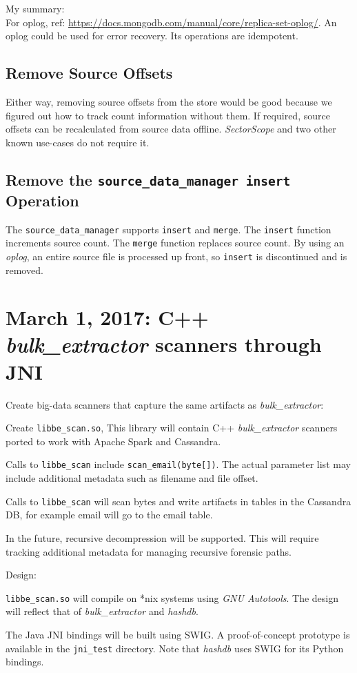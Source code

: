 \documentclass[12pt,twoside]{article}
\newcommand \hdb {\textit{hashdb}\xspace}
\newcommand \sscope {\textit{SectorScope}\xspace}
\newcommand \bulk {\textit{bulk\_extractor}\xspace}
\begin{document}
My summary:\\
For oplog, ref: \url{https://docs.mongodb.com/manual/core/replica-set-oplog/}. An oplog could be used for error recovery.  Its operations are idempotent.

\subsection{Remove Source Offsets}
Either way, removing source offsets from the store would be good because we figured out how to track count information without them. If required, source offsets can be recalculated from source data offline. \sscope and two other known use-cases do not require it.

\subsection{Remove the \texttt{source\_data\_manager insert} Operation}
The \verb+source_data_manager+ supports \verb+insert+ and \verb+merge+.
The \verb+insert+ function increments source count.
The \verb+merge+ function replaces source count.
By using an \textit{oplog}, an entire source file is processed up front, so \verb+insert+ is discontinued and is removed.

\section{March 1, 2017: C++ \bulk scanners through JNI}
Create big-data scanners that capture the same artifacts as \bulk:
\begin{compactitem}
\item Create \verb+libbe_scan.so+, This library will contain C++ \bulk scanners ported to work with Apache Spark and Cassandra.
\item Calls to \verb+libbe_scan+ include \verb+scan_email(byte[])+. The actual parameter list may include additional metadata such as filename and file offset.
\item Calls to \verb+libbe_scan+ will scan bytes and write artifacts in tables in the Cassandra DB, for example email will go to the email table.
\item In the future, recursive decompression will be supported. This will require tracking additional metadata for managing recursive forensic paths.
\end{compactitem}
Design:
\begin{compactitem}
\item \verb+libbe_scan.so+ will compile on *nix systems using \textit{GNU Autotools}. The design will reflect that of \bulk and \hdb.
\item The Java JNI bindings will be built using SWIG. A proof-of-concept prototype is available in the \verb+jni_test+ directory. Note that \hdb uses SWIG for its Python bindings.
\end{compactitem}
\end{document}
